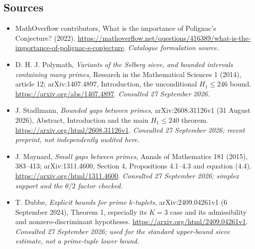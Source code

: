 \documentclass[11pt,a4paper]{article}
\numberwithin{equation}{section}
\begin{document}
\subsection{Sources}
\begin{itemize}\raggedright
\item[\textnormal{[S1]}]\hypertarget{source:106:1}{} MathOverflow contributors, What is the importance of Polignac's Conjecture? (2022).
\url{https://mathoverflow.net/questions/416389/what-is-the-importance-of-polignac-s-conjecture}.
{\small\textit{Catalogue formulation source.}}
\item[\textnormal{[E1]}]\hypertarget{extra:106:1}{} D. H. J. Polymath,
\emph{Variants of the Selberg sieve, and bounded intervals containing many
primes}, Research in the Mathematical Sciences 1 (2014), article 12;
arXiv:1407.4897, Introduction, the unconditional $H_1\leq246$ bound.
\url{https://arxiv.org/abs/1407.4897}.
{\small\textit{Consulted 27 September 2026.}}
\item[\textnormal{[E2]}]\hypertarget{extra:106:2}{} J. Stadlmann,
\emph{Bounded gaps between primes}, arXiv:2608.31126v1
(31 August 2026), Abstract, Introduction and the main $H_1\leq240$ theorem.
\url{https://arxiv.org/html/2608.31126v1}.
{\small\textit{Consulted 27 September 2026; recent preprint, not independently audited here.}}
\item[\textnormal{[E3]}]\hypertarget{extra:106:3}{} J. Maynard,
\emph{Small gaps between primes}, Annals of Mathematics 181 (2015), 383--413;
arXiv:1311.4600, Section 4, Propositions 4.1--4.3 and equation (4.4).
\url{https://arxiv.org/html/1311.4600}.
{\small\textit{Consulted 27 September 2026; simplex support and the $\theta/2$ factor checked.}}
\item[\textnormal{[E4]}]\hypertarget{extra:106:4}{} T. Dubbe,
\emph{Explicit bounds for prime $k$-tuplets}, arXiv:2409.04261v1
(6 September 2024), Theorem 1, especially its $K=3$ case and its
admissibility and nonzero-discriminant hypotheses.
\url{https://arxiv.org/html/2409.04261v1}.
{\small\textit{Consulted 27 September 2026; used for the standard upper-bound sieve estimate, not a prime-tuple lower bound.}}
\end{itemize}
\end{document}
